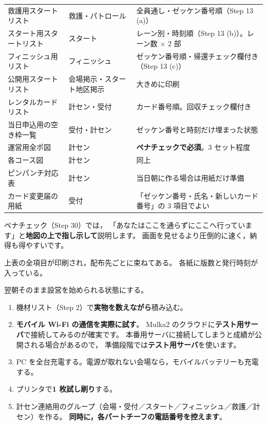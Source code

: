 \begin{center}
\small
\begin{tabular}{@{}P{42mm}P{18mm}P{84mm}@{}}
\toprule
{} &  &  \\
\midrule
救護用スタートリスト & 救護・パトロール & 全員通し・ゼッケン番号順（Step 13 (a)） \\
スタート用スタートリスト & スタート & レーン別・時刻順（Step 13 (b)）。レーン数 $\times$ 2 部 \\
フィニッシュ用リスト & フィニッシュ & ゼッケン番号順・帰還チェック欄付き（Step 13 (c)） \\
公開用スタートリスト & 会場掲示・スタート地区掲示 & 大きめに印刷 \\
レンタルカードリスト & 計セン・受付 & カード番号順。回収チェック欄付き \\
当日申込用の空き枠一覧 & 受付・計セン & ゼッケン番号と時刻だけ埋まった状態 \\
運営用全ポ図 & 計セン & \textbf{ペナチェックで必須}。3 セット程度 \\
各コース図 & 計セン & 同上 \\
ピンパンチ対応表 & 計セン & 当日朝に作る場合は用紙だけ準備 \\
カード変更届の用紙 & 受付 & 「ゼッケン番号・氏名・新しいカード番号」の 3 項目でよい \\
\bottomrule
\end{tabular}
\end{center}

\begin{Note}[全ポ図とコース図は紙で持つ]
ペナチェック（Step 30）では，
「あなたはここを通らずにここへ行っています」と\textbf{地図の上で指し示して}説明します。
画面を見せるより圧倒的に速く，納得も得やすいです。
\end{Note}

\begin{Done}
上表の全項目が印刷され，配布先ごとに束ねてある。
各紙に版数と発行時刻が入っている。
\end{Done}


\begin{Goal}
翌朝そのまま設営を始められる状態にする。
\end{Goal}

\begin{enumerate}
\item 機材リスト（Step 2）で\textbf{実物を数えながら}積み込む。
\item \textbf{モバイル Wi-Fi の通信を実際に試す}。
      Mulka2 のクラウドに\textbf{テスト用サーバ}で接続してみるのが確実です。
      本番用サーバに接続してしまうと成績が公開される場合があるので，
      準備段階では\textbf{テスト用サーバ}を使います。\ver
\item PC を全台充電する。電源が取れない会場なら，モバイルバッテリーも充電する。
\item プリンタで\textbf{1 枚試し刷り}する。
\item 計セン連絡用のグループ（会場・受付／スタート／フィニッシュ／救護／計セン）を作る。
      \textbf{同時に，各パートチーフの電話番号を控えます}。
\end{enumerate}

